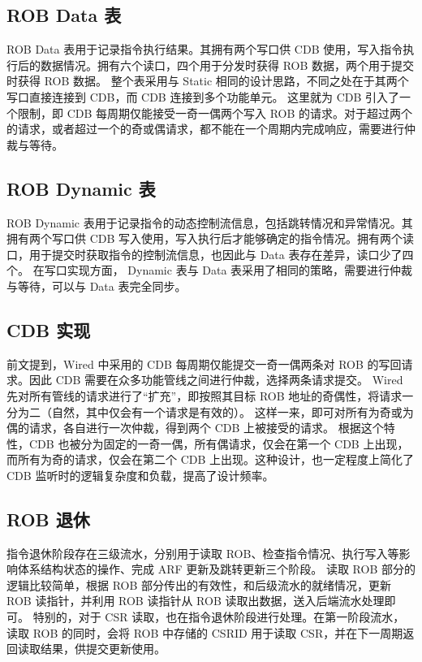 \subsection{ROB Data 表}\label{sec:05-complex-cpu-008}

ROB Data 表用于记录指令执行结果。其拥有两个写口供 CDB 使用，写入指令执行后的数据情况。拥有六个读口，四个用于分发时获得 ROB 数据，两个用于提交时获得 ROB 数据。 整个表采用与 Static 相同的设计思路，不同之处在于其两个写口直接连接到 CDB，而 CDB 连接到多个功能单元。 这里就为 CDB 引入了一个限制，即 CDB 每周期仅能接受一奇一偶两个写入 ROB 的请求。对于超过两个的请求，或者超过一个的奇或偶请求，都不能在一个周期内完成响应，需要进行仲裁与等待。

\subsection{ROB Dynamic 表}\label{sec:05-complex-cpu-009}

ROB Dynamic 表用于记录指令的动态控制流信息，包括跳转情况和异常情况。其拥有两个写口供 CDB 写入使用，写入执行后才能够确定的指令情况。拥有两个读口，用于提交时获取指令的控制流信息，也因此与 Data 表存在差异，读口少了四个。 在写口实现方面， Dynamic 表与 Data 表采用了相同的策略，需要进行仲裁与等待，可以与 Data 表完全同步。

\subsection{CDB 实现}\label{sec:05-complex-cpu-010}

前文提到，Wired 中采用的 CDB 每周期仅能提交一奇一偶两条对 ROB 的写回请求。因此 CDB 需要在众多功能管线之间进行仲裁，选择两条请求提交。 Wired 先对所有管线的请求进行了``扩充''，即按照其目标 ROB 地址的奇偶性，将请求一分为二（自然，其中仅会有一个请求是有效的）。 这样一来，即可对所有为奇或为偶的请求，各自进行一次仲裁，得到两个 CDB 上被接受的请求。 根据这个特性，CDB 也被分为固定的一奇一偶，所有偶请求，仅会在第一个 CDB 上出现，而所有为奇的请求，仅会在第二个 CDB 上出现。这种设计，也一定程度上简化了 CDB 监听时的逻辑复杂度和负载，提高了设计频率。

\subsection{ROB 退休}\label{sec:05-complex-cpu-011}

指令退休阶段存在三级流水，分别用于读取 ROB、检查指令情况、执行写入等影响体系结构状态的操作、完成 ARF 更新及跳转更新三个阶段。 读取 ROB 部分的逻辑比较简单，根据 ROB 部分传出的有效性，和后级流水的就绪情况，更新 ROB 读指针，并利用 ROB 读指针从 ROB 读取出数据，送入后端流水处理即可。 特别的，对于 CSR 读取，也在指令退休阶段进行处理。在第一阶段流水，读取 ROB 的同时，会将 ROB 中存储的 CSRID 用于读取 CSR，并在下一周期返回读取结果，供提交更新使用。

